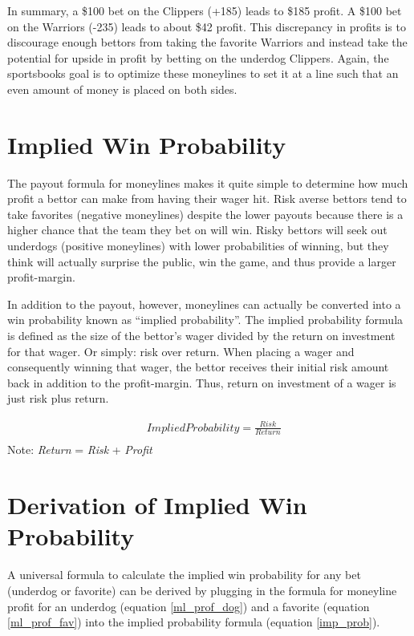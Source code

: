 \documentclass [MS] {uclathes}
\begin{document}
In summary, a \$100 bet on the Clippers (+185) leads to \$185 profit. A \$100 bet on the Warriors (-235) leads to about \$42 profit. This discrepancy in profits is to discourage enough bettors from taking the favorite Warriors and instead take the potential for upside in profit by betting on the underdog Clippers. Again, the sportsbooks goal is to optimize these moneylines to set it at a line such that an even amount of money is placed on both sides. 

\section{Implied Win Probability}
The payout formula for moneylines makes it quite simple to determine how much profit a bettor can make from having their wager hit. Risk averse bettors tend to take favorites (negative moneylines) despite the lower payouts because there is a higher chance that the team they bet on will win. Risky bettors will seek out underdogs (positive moneylines) with lower probabilities of winning, but they think will actually surprise the public, win the game, and thus provide a larger profit-margin. 

In addition to the payout, however, moneylines can actually be converted into a win probability known as ``implied probability''. The implied probability formula is defined as the size of the bettor's wager divided by the return on investment for that wager. Or simply: risk over return. When placing a wager and consequently winning that wager, the bettor receives their initial risk amount back in addition to the profit-margin. Thus, return on investment of a wager is just risk plus return.

\begin{equation} \label{imp_prob}
\begin{split}
& Implied Probability = \frac{Risk}{Return}  \\
\end{split}
\end{equation}
Note: \emph{Return} = \emph{Risk} + \emph{Profit}

\section{Derivation of Implied Win Probability}
A universal formula to calculate the implied win probability for any bet (underdog or favorite) can be derived by plugging in the formula for moneyline profit for an underdog (equation \ref{ml_prof_dog}) and a favorite (equation \ref{ml_prof_fav}) into the implied probability formula (equation \ref{imp_prob}).
\end{document}
